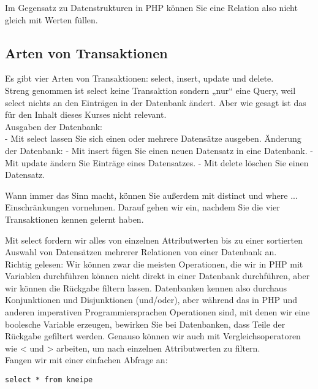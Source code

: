 \begin{verbatimg}
Im Gegensatz zu Datenstrukturen in PHP können Sie eine Relation also nicht gleich mit Werten füllen.

\subsection{Arten von Transaktionen}

Es gibt vier Arten von Transaktionen: select, insert, update und delete.\\


Streng genommen ist select keine Transaktion sondern „nur“ eine Query, weil select nichts an den Einträgen in der Datenbank ändert. Aber wie gesagt ist das für den Inhalt dieses Kurses nicht relevant.\\

Ausgaben der Datenbank: \\


-	Mit select lassen Sie sich einen oder mehrere Datensätze ausgeben.
Änderung der Datenbank: 
-	Mit insert fügen Sie einen neuen Datensatz in eine Datenbank.
-	Mit update ändern Sie Einträge eines Datensatzes.
-	Mit delete löschen Sie einen Datensatz.

Wann immer das Sinn macht, können Sie außerdem mit distinct und where ... Einschränkungen vornehmen. Darauf gehen wir ein, nachdem Sie die vier Transaktionen kennen gelernt haben.


Mit select fordern wir alles von einzelnen Attributwerten bis zu einer sortierten Auswahl von Datensätzen mehrerer Relationen von einer Datenbank an. \\


Richtig gelesen: Wir können zwar die meisten Operationen, die wir in PHP mit Variablen durchführen können nicht direkt in einer Datenbank durchführen, aber wir können die Rückgabe filtern lassen. Datenbanken kennen also durchaus Konjunktionen und Disjunktionen (und/oder), aber während das in PHP und anderen imperativen Programmiersprachen Operationen sind, mit denen wir eine boolesche Variable erzeugen, bewirken Sie bei Datenbanken, dass Teile der Rückgabe gefiltert werden. Genauso können wir auch mit Vergleichsoperatoren wie < und > arbeiten, um nach einzelnen Attributwerten zu filtern.\\


Fangen wir mit einer einfachen Abfrage an:\\


\begin{verbatim}
select * from kneipe
\end{verbatim}


\end{verbatimg}
